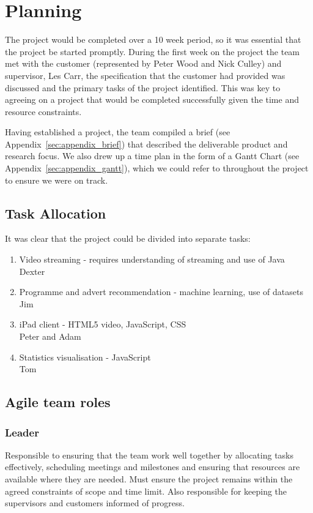 \section{Planning}

The project would be completed over a 10 week period, so it was essential that the project be started promptly. During the first week on the project the team met with the customer (represented by Peter Wood and Nick Culley) and supervisor, Les Carr, the specification that the customer had provided was discussed and the primary tasks of the project identified. This was key to agreeing on a project that would be completed successfully given the time and resource constraints.

Having established a project, the team compiled a brief (see Appendix~\ref{sec:appendix_brief}) that described the deliverable product and research focus. We also drew up a time plan in the form of a Gantt Chart (see Appendix~\ref{sec:appendix_gantt}), which we could refer to throughout the project to ensure we were on track.

\subsection{Task Allocation}
It was clear that the project could be divided into separate tasks:
\begin{enumerate}
\item Video streaming - requires understanding of streaming and use of Java\\
		Dexter
\item Programme and advert recommendation - machine learning, use of datasets\\
		Jim
\item iPad client - HTML5 video, JavaScript, CSS\\
		Peter and Adam
\item Statistics visualisation - JavaScript\\
		Tom
\end{enumerate}

\subsection{Agile team roles}
\subsubsection{Leader}
Responsible to ensuring that the team work well together by allocating tasks effectively, scheduling meetings and milestones and ensuring that resources are available where they are needed. Must ensure the project remains within the agreed constraints of scope and time limit. Also responsible for keeping the supervisors and customers informed of progress.

